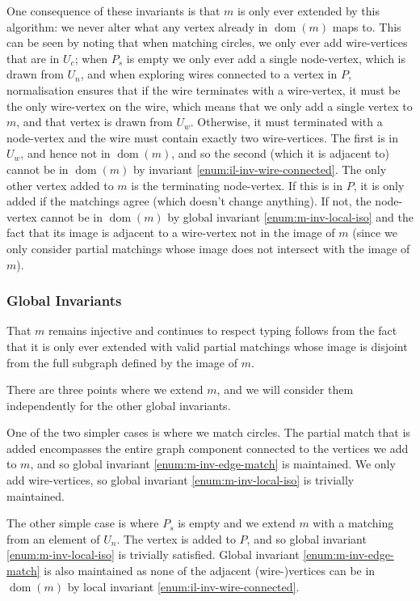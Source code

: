 \documentclass{article}
\DeclareMathOperator{\dom}{dom}
\begin{document}
One consequence of these invariants is that $m$ is only ever extended by this algorithm: we never alter what any vertex already in $\dom(m)$ maps to.  This can be seen by noting that when matching circles, we only ever add wire-vertices that are in $U_c$; when $P_s$ is empty we only ever add a single node-vertex, which is drawn from $U_n$, and when exploring wires connected to a vertex in $P$, normalisation ensures that if the wire terminates with a wire-vertex, it must be the only wire-vertex on the wire, which means that we only add a single vertex to $m$, and that vertex is drawn from $U_w$.  Otherwise, it must terminated with a node-vertex and the wire must contain exactly two wire-vertices.  The first is in $U_w$, and hence not in $\dom(m)$, and so the second (which it is adjacent to) cannot be in $\dom(m)$ by invariant \ref{enum:il-inv-wire-connected}.  The only other vertex added to $m$ is the terminating node-vertex.  If this is in $P$, it is only added if the matchings agree (which doesn't change anything).  If not, the node-vertex cannot be in $\dom(m)$ by global invariant \ref{enum:m-inv-local-iso} and the fact that its image is adjacent to a wire-vertex not in the image of $m$ (since we only consider partial matchings whose image does not intersect with the image of $m$).

\subsubsection{Global Invariants}

That $m$ remains injective and continues to respect typing follows from the fact that it is only ever extended with valid partial matchings whose image is disjoint from the full subgraph defined by the image of $m$.

There are three points where we extend $m$, and we will consider them independently for the other global invariants.

One of the two simpler cases is where we match circles.  The partial match that is added encompasses the entire graph component connected to the vertices we add to $m$, and so global invariant \ref{enum:m-inv-edge-match} is maintained.  We only add wire-vertices, so global invariant \ref{enum:m-inv-local-iso} is trivially maintained.

The other simple case is where $P_s$ is empty and we extend $m$ with a matching from an element of $U_n$.  The vertex is added to $P$, and so global invariant \ref{enum:m-inv-local-iso} is trivially satisfied.  Global invariant \ref{enum:m-inv-edge-match} is also maintained as none of the adjacent (wire-)vertices can be in $\dom(m)$ by local invariant \ref{enum:il-inv-wire-connected}.
\end{document}
